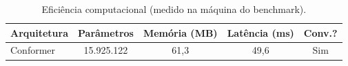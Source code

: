 \begin{table}[H]
\centering
\caption{Eficiência computacional (medido na máquina do benchmark).}
\label{tab:bench_eficiencia}
\small\singlespacing
\begin{tabular}{lcccc}
\toprule
\textbf{Arquitetura} & \textbf{Parâmetros} & \textbf{Memória (MB)} & \textbf{Latência (ms)} & \textbf{Conv.?} \\
\midrule
Conformer & 15.925.122 & 61,3 & 49,6 & \textcolor{successgreen}{Sim} \\
\bottomrule
\end{tabular}
\end{table}
